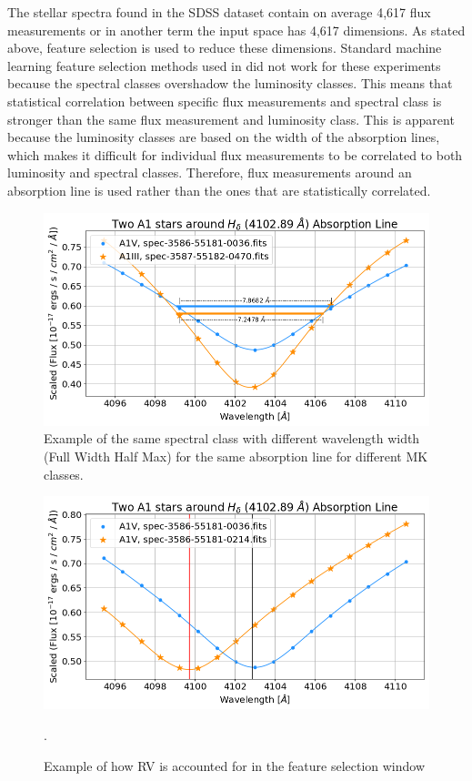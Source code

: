 \documentclass[trackchanges, floatfix, twocolumn, tighten]{aastex62}
\begin{document}
The stellar spectra found in the SDSS dataset contain on average 4,617 flux measurements or in another term the input space has 4,617 dimensions. As stated above, feature selection is used to reduce these dimensions. Standard machine learning feature selection methods used in \cite{brice} did not work for these experiments because the spectral classes overshadow the luminosity classes. This means that statistical correlation between specific flux measurements and spectral class is stronger than the same flux measurement and luminosity class. This is apparent because the luminosity classes are based on the width of the absorption lines, which makes it difficult for individual flux measurements to be correlated to both luminosity and spectral classes. Therefore, flux measurements around an absorption line is used rather than the ones that are statistically correlated. 

\begin{figure}
	\centering
	\includegraphics[width=1\linewidth]{figures/2A1.png}
	\caption{Example of the same spectral class with different wavelength width (Full Width Half Max) for the same absorption line for different MK classes.}
	\label{fig:2A1}
\end{figure}

\begin{figure}
	\centering
	\includegraphics[width=1\linewidth]{figures/Red_Example.png}
	\caption{Example of how RV is accounted for in the feature selection window}.
	\label{fig:redP}
\end{figure}
\end{document}
